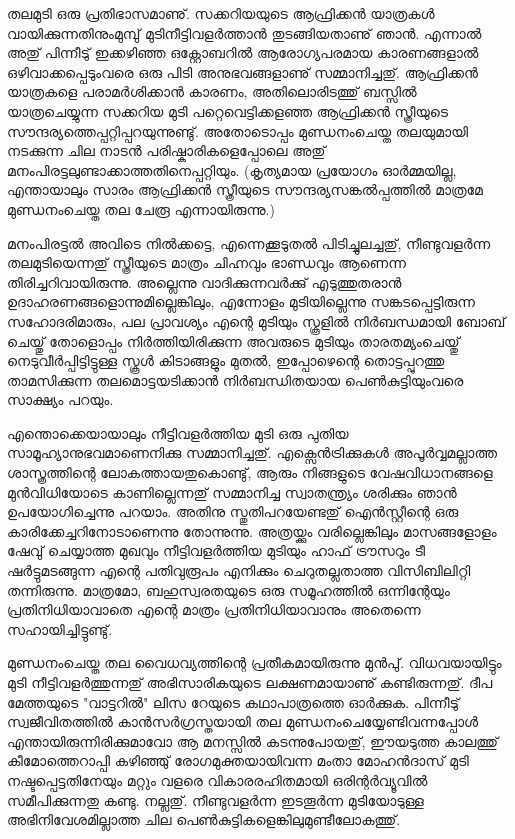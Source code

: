﻿
\enlargethispage*{2\baselineskip}
\setlength{\parskip}{2pt plus 1pt minus 1pt} %

തലമുടി ഒരു പ്രതിഭാസമാണു്. സക്കറിയയുടെ ആഫ്രിക്കന്‍ യാത്രകള്‍ വായിക്കുന്നതിനുംമുമ്പു് മുടിനീട്ടിവളര്‍ത്താന്‍ 
തുടങ്ങിയതാണു് ഞാന്‍. എന്നാല്‍ അതു് പിന്നീടു് ഇക്കഴിഞ്ഞ ഒക്റ്റോബറില്‍ ആരോഗ്യപരമായ കാരണങ്ങളാല്‍ 
ഒഴിവാക്കപ്പെടുംവരെ ഒരു പിടി അനുഭവങ്ങളാണു് സമ്മാനിച്ചതു്. ആഫ്രിക്കന്‍ യാത്രകളെ പരാമര്‍ശിക്കാന്‍ കാരണം, 
അതിലൊരിടത്തു് ബസ്സില്‍ യാത്രചെയ്യുന്ന സക്കറിയ മുടി പറ്റെവെട്ടിക്കളഞ്ഞ ആഫ്രിക്കന്‍ സ്ത്രീയുടെ 
സൗന്ദര്യത്തെപ്പറ്റിപ്പറയുന്നുണ്ടു്. അതോടൊപ്പം മുണ്ഡനംചെയ്ത തലയുമായി നടക്കുന്ന ചില നാടന്‍ 
പരിഷ്കാരികളെപ്പോലെ അതു് മനംപിരട്ടലുണ്ടാക്കാത്തതിനെപ്പറ്റിയും. (കൃത്യമായ പ്രയോഗം ഓര്‍മ്മയില്ല, എന്തായാലും 
സാരം ആഫ്രിക്കന്‍ സ്ത്രീയുടെ സൗന്ദര്യസങ്കല്‍പ്പത്തില്‍ മാത്രമേ മുണ്ഡനംചെയ്ത തല ചേരൂ എന്നായിരുന്നു.)

മനംപിരട്ടല്‍ അവിടെ നില്‍ക്കട്ടെ, എന്നെക്കൂടുതല്‍ പിടിച്ചുലച്ചതു്, നീണ്ടുവളര്‍ന്ന തലമുടിയെന്നതു് സ്ത്രീയുടെ മാത്രം ചിഹ്നവും 
ഭാണ്ഡവും ആണെന്ന തിരിച്ചറിവായിരുന്നു. അല്ലെന്നു വാദിക്കുന്നവര്‍ക്കു് എടുത്തുതരാന്‍ ഉദാഹരണങ്ങളൊന്നുമില്ലെങ്കിലും, 
എന്നോളം മുടിയില്ലെന്നു സങ്കടപ്പെട്ടിരുന്ന സഹോദരിമാരും, പല പ്രാവശ്യം എന്റെ മുടിയും സ്കൂളില്‍ നിര്‍ബന്ധമായി ബോബ് 
ചെയ്തു് തോളൊപ്പം നിര്‍ത്തിയിരിക്കുന്ന അവരുടെ മുടിയും താരതമ്യംചെയ്തു് നെടുവീര്‍പ്പിട്ടിട്ടുള്ള സ്കൂള്‍ കിടാങ്ങളും മുതല്‍, 
ഇപ്പോഴെന്റെ തൊട്ടപ്പുറത്തു താമസിക്കുന്ന തലമൊട്ടയടിക്കാന്‍ നിര്‍ബന്ധിതയായ പെണ്‍കുട്ടിയുംവരെ സാക്ഷ്യം പറയും.

എന്തൊക്കെയായാലും നീട്ടിവളര്‍ത്തിയ മുടി ഒരു പുതിയ സാമൂഹ്യാനുഭവമാണെനിക്കു സമ്മാനിച്ചതു്. എക്സെന്‍ട്രിക്കുകള്‍ 
അപൂര്‍വ്വമല്ലാത്ത ശാസ്ത്രത്തിന്റെ ലോകത്തായതുകൊണ്ടു്, ആരും നിങ്ങളുടെ വേഷവിധാനങ്ങളെ മുന്‍വിധിയോടെ 
കാണില്ലെന്നതു് സമ്മാനിച്ച സ്വാതന്ത്ര്യം ശരിക്കും ഞാന്‍ ഉപയോഗിച്ചെന്നു പറയാം. അതിനു സ്തുതിപറയേണ്ടതു് ഐന്‍സ്റ്റീന്റെ 
ഒരു കാരിക്കേച്ചറിനോടാണെന്നു തോന്നുന്നു. അത്രയ്ക്കും വരില്ലെങ്കിലും മാസങ്ങളോളം ഷേവു് ചെയ്യാത്ത മുഖവും നീട്ടിവളര്‍ത്തിയ 
മുടിയും ഹാഫ് ട്രൗസറും ടീ ഷര്‍ട്ടുമടങ്ങുന്ന എന്റെ പതിവുരൂപം എനിക്കും ചെറുതല്ലതാത്ത വിസിബിലിറ്റി തന്നിരുന്നു. 
മാത്രമോ, ബഹുസ്വരതയുടെ ഒരു സമൂഹത്തില്‍ ഒന്നിന്റേയും പ്രതിനിധിയാവാതെ എന്റെ മാത്രം പ്രതിനിധിയാവാനും 
അതെന്നെ സഹായിച്ചിട്ടുണ്ടു്.

മുണ്ഡനംചെയ്ത തല വൈധവ്യത്തിന്റെ പ്രതീകമായിരുന്നു മുന്‍പു്. വിധവയായിട്ടും മുടി നീട്ടിവളര്‍ത്തുന്നതു് അഭിസാരികയുടെ 
ലക്ഷണമായാണു് കണ്ടിരുന്നതു്. ദീപ മേത്തയുടെ "വാട്ടറില്‍" ലിസ റേയുടെ കഥാപാത്രത്തെ ഓര്‍ക്കുക. പിന്നീടു് 
സ്വജീവിതത്തില്‍ കാന്‍സര്‍ഗ്രസ്തയായി തല മുണ്ഡനംചെയ്യേണ്ടിവന്നപ്പോള്‍ എന്തായിരുന്നിരിക്കുമാവോ ആ മനസ്സില്‍ 
കടന്നുപോയതു്, ഈയടുത്ത കാലത്തു് കീമോത്തെറാപ്പി കഴിഞ്ഞു് രോഗമുക്തയായിവന്ന മംതാ മോഹന്‍ദാസ് മുടി 
നഷ്ടപ്പെട്ടതിനേയും മറ്റും വളരെ വികാരരഹിതമായി ഒരിന്റര്‍വ്യൂവില്‍ സമീപിക്കുന്നതു കണ്ടു. നല്ലതു്. നീണ്ടുവളര്‍ന്ന ഇടതൂര്‍ന്ന 
മുടിയോടുള്ള അഭിനിവേശമില്ലാത്ത ചില പെണ്‍കുട്ടികളെങ്കിലുമുണ്ടീലോകത്തു്.

